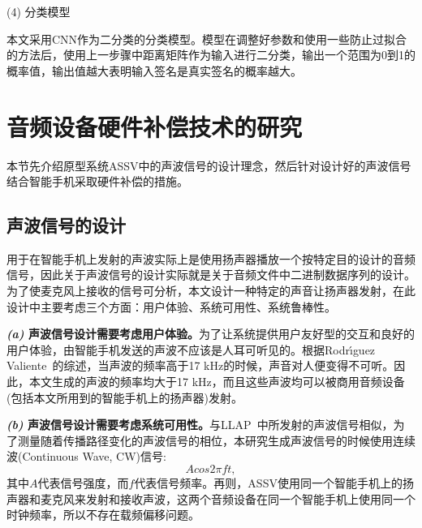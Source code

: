 (4) 分类模型

本文采用CNN作为二分类的分类模型。模型在调整好参数和使用一些防止过拟合的方法后，使用上一步骤中距离矩阵作为输入进行二分类，输出一个范围为0到1的概率值，输出值越大表明输入签名是真实签名的概率越大。

\section{音频设备硬件补偿技术的研究}\label{sec:audio-research}

本节先介绍原型系统ASSV中的声波信号的设计理念，然后针对设计好的声波信号结合智能手机采取硬件补偿的措施。

\subsection{声波信号的设计}

用于在智能手机上发射的声波实际上是使用扬声器播放一个按特定目的设计的音频信号，因此关于声波信号的设计实际就是关于音频文件中二进制数据序列的设计。为了使麦克风上接收的信号可分析，本文设计一种特定的声音让扬声器发射，在此设计中主要考虑三个方面：用户体验、系统可用性、系统鲁棒性。

\textbf{\textit{(a)} 声波信号设计需要考虑用户体验。}为了让系统提供用户友好型的交互和良好的用户体验，由智能手机发送的声波不应该是人耳可听见的。根据Rodr{\'\i}guez Valiente~\cite{rodriguez2014extended}的综述，当声波的频率高于17 kHz的时候，声音对人便变得不可听。因此，本文生成的声波的频率均大于17 kHz，而且这些声波均可以被商用音频设备(包括本文所用到的智能手机上的扬声器)发射。

\textbf{\textit{(b)} 声波信号设计需要考虑系统可用性。}与LLAP~\cite{wang2016device}中所发射的声波信号相似，为了测量随着传播路径变化的声波信号的相位，本研究生成声波信号的时候使用连续波(Continuous Wave, CW)信号:
$$
Acos2\pi ft, 
$$
其中$A$代表信号强度，而$f$代表信号频率。再则，ASSV使用同一个智能手机上的扬声器和麦克风来发射和接收声波，这两个音频设备在同一个智能手机上使用同一个时钟频率，所以不存在载频偏移问题。

